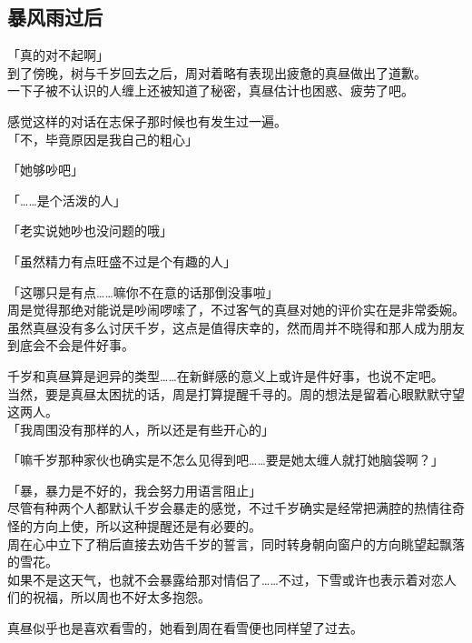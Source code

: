 \subsection{暴风雨过后}

「真的对不起啊」\\

到了傍晚，树与千岁回去之后，周对着略有表现出疲惫的真昼做出了道歉。\\

一下子被不认识的人缠上还被知道了秘密，真昼估计也困惑、疲劳了吧。

感觉这样的对话在志保子那时候也有发生过一遍。\\

「不，毕竟原因是我自己的粗心」

「她够吵吧」

「……是个活泼的人」

「老实说她吵也没问题的哦」

「虽然精力有点旺盛不过是个有趣的人」

「这哪只是有点……嘛你不在意的话那倒没事啦」\\

周是觉得那绝对能说是吵闹啰嗦了，不过客气的真昼对她的评价实在是非常委婉。\\

虽然真昼没有多么讨厌千岁，这点是值得庆幸的，然而周并不晓得和那人成为朋友到底会不会是件好事。

千岁和真昼算是迥异的类型……在新鲜感的意义上或许是件好事，也说不定吧。\\

当然，要是真昼太困扰的话，周是打算提醒千寻的。周的想法是留着心眼默默守望这两人。\\

「我周围没有那样的人，所以还是有些开心的」

「嘛千岁那种家伙也确实是不怎么见得到吧……要是她太缠人就打她脑袋啊？」

「暴，暴力是不好的，我会努力用语言阻止」\\

尽管有种两个人都默认千岁会暴走的感觉，不过千岁确实是经常把满腔的热情往奇怪的方向上使，所以这种提醒还是有必要的。\\

周在心中立下了稍后直接去劝告千岁的誓言，同时转身朝向窗户的方向眺望起飘落的雪花。\\

如果不是这天气，也就不会暴露给那对情侣了……不过，下雪或许也表示着对恋人们的祝福，所以周也不好太多抱怨。

真昼似乎也是喜欢看雪的，她看到周在看雪便也同样望了过去。\\

